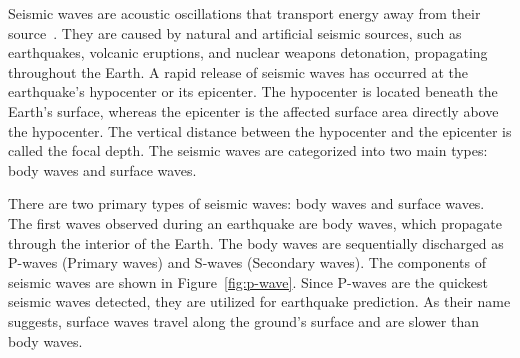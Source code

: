 
Seismic waves are acoustic oscillations that transport energy away from their source~\cite{salam2021earthquake}. They are caused by natural and artificial seismic sources, such as earthquakes, volcanic eruptions, and nuclear weapons detonation, propagating throughout the Earth. A rapid release of seismic waves has occurred at the earthquake's hypocenter or its epicenter. The hypocenter is located beneath the Earth's surface, whereas the epicenter is the affected surface area directly above the hypocenter. The vertical distance between the hypocenter and the epicenter is called the focal depth. The seismic waves are categorized into two main types: body waves and surface waves. 

There are two primary types of seismic waves: body waves and surface waves. The first waves observed during an earthquake are body waves, which propagate through the interior of the Earth. The body waves are sequentially discharged as P-waves (Primary waves) and S-waves (Secondary waves). The components of seismic waves are shown in Figure~\ref{fig:p-wave}. Since P-waves are the quickest seismic waves detected, they are utilized for earthquake prediction.  As their name suggests, surface waves travel along the ground's surface and are slower than body waves\cite{mousavi2020machine}.  

 
 

